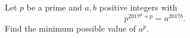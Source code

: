 Let $p$ be a prime and $a,b$ positive integers with
\[
p^{2017^p+p}=a^{2017b}.
\]
Find the minimum possible value of $a^p$.
